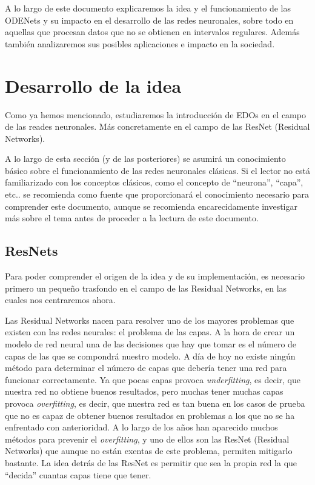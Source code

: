 \documentclass[12pt]{report}
\begin{document}
A lo largo de este documento explicaremos la idea y el funcionamiento de las ODENets y su impacto en el desarrollo de las redes neuronales, sobre todo en aquellas que procesan datos que no se obtienen en intervalos regulares. Además también analizaremos sus posibles aplicaciones e impacto en la sociedad.

\chapter{Desarrollo de la idea}

Como ya hemos mencionado, estudiaremos la introducción de EDOs en el campo de
las reades neuronales. Más concretamente en el campo de las ResNet (Residual
Networks).

A lo largo de esta sección (y de las posteriores) se asumirá un conocimiento
básico sobre el funcionamiento de las redes neuronales clásicas. Si el lector no
está familiarizado con los conceptos clásicos, como el concepto de ``neurona'',
``capa'', etc.. se recomienda \cite{brown17} como fuente que proporcionará el
conocimiento necesario para comprender este documento, aunque se recomienda
encarecidamente investigar más sobre el tema antes de proceder a la lectura de
este documento.

\section{ResNets}

Para poder comprender el origen de la idea y de su implementación, es necesario
primero un pequeño trasfondo en el campo de las Residual Networks, en las cuales
nos centraremos ahora.

Las Residual Networks nacen para resolver uno de los mayores problemas que
existen con las redes neurales: el problema de las capas. A la hora de crear un
modelo de red neural una de las decisiones que hay que tomar es el número de
capas de las que se compondrá nuestro modelo. A día de hoy no existe ningún
método para determinar el número de capas que debería tener una red para
funcionar correctamente. Ya que pocas capas provoca \textit{underfitting}, es
decir, que nuestra red no obtiene buenos resultados, pero muchas tener muchas
capas provoca \textit{overfitting}, es decir, que nuestra red es tan buena en
los casos de prueba que no es capaz de obtener buenos resultados en problemas
a los que no se ha enfrentado con anterioridad. A lo largo de los años han
aparecido muchos métodos para prevenir el \textit{overfitting}, y uno de ellos
son las ResNet (Residual Networks) que aunque no están exentas de este
problema, permiten mitigarlo bastante. La idea detrás de las ResNet es permitir
que sea la propia red la que ``decida'' cuantas capas tiene que tener.
\end{document}
